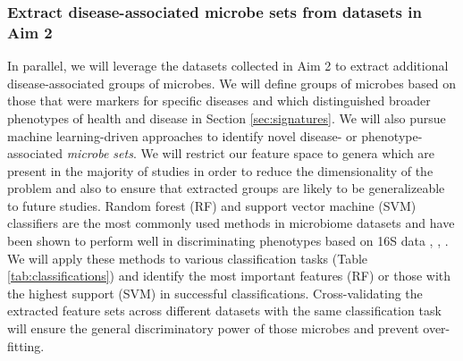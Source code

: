 \documentclass[12pt]{article}
\begin{document}
\subsubsection{Extract disease-associated microbe sets from datasets in Aim 2}
In parallel, we will leverage the datasets collected in Aim 2 to extract additional 
disease-associated groups of microbes. We will define groups of 
microbes based on those that were markers for specific diseases and which
distinguished broader phenotypes of health and disease in Section \ref{sec:signatures}. 
We will also pursue machine learning-driven approaches to identify novel disease- or 
phenotype-associated \textit{microbe sets}. We will restrict our feature space
to genera which are present in the majority of studies in order to reduce the
dimensionality of the problem and also to ensure that extracted groups
are likely to be generalizeable to future studies. Random forest (RF) and support
vector machine (SVM) classifiers are the most commonly used methods in
microbiome datasets and have been shown to perform well in discriminating
phenotypes based on 16S data \cite{pasolli-meta_analysis-2016}, \cite{ibd-papa}, \cite{knights-supervised-2010}. We will apply these methods to various classification tasks (Table \ref{tab:classifications})
and identify the most important features (RF) or those with the highest support (SVM)
in successful classifications.
Cross-validating the extracted feature sets across different datasets with the same
classification task will ensure the general discriminatory 
power of those microbes and prevent over-fitting.
\end{document}
